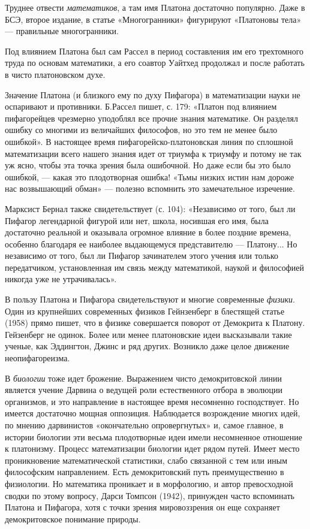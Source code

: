 Труднее отвести \textit{математиков}, а там имя Платона достаточно
популярно. Даже в БСЭ, второе издание, в статье «Многогранники»
фигурируют «Платоновы тела» --- правильные многогранники.

Под влиянием Платона был сам Рассел в период составления им его
трехтомного труда по основам математики, а его соавтор Уайтхед
продолжал и после работать в чисто платоновском духе.

Значение Платона (и близкого ему по духу Пифагора) в математизации
науки не оспаривают и противники. Б.Рассел пишет, с. 179: «Платон под
влиянием пифагорейцев чрезмерно уподоблял все прочие знания
математике. Он разделял ошибку со многими из величайших философов, но
это тем не менее было ошибкой». В настоящее время
пифагорейско-платоновская линия по сплошной математизации всего нашего
знания идет от триумфа к триумфу и потому не так уж ясно, чтобы эта
точка зрения была ошибочной. Но даже если бы это было ошибкой, ---
какая это плодотворная ошибка! «Тьмы низких истин нам дороже нас
возвышающий обман» --- полезно вспомнить это замечательное изречение.

Марксист Бернал также свидетельствует (с. 104): «Независимо от того,
был ли Пифагор легендарной фигурой или нет, школа, носившая его имя,
была достаточно реальной и оказывала огромное влияние в более поздние
времена, особенно благодаря ее наиболее выдающемуся представителю ---
Платону... Но независимо от того, был ли Пифагор зачинателем этого
учения или только передатчиком, установленная им связь между
математикой, наукой и философией никогда уже не утрачивалась».

В пользу Платона и Пифагора свидетельствуют и многие современные
\textit{физики}. Один из крупнейших современных физиков Гейнзенберг в
блестящей статье (1958) прямо пишет, что в физике совершается поворот
от Демокрита к Платону. Гейзенберг не одинок. Более или менее
платоновские идеи высказывали такие ученые, как Эддингтон, Джинс и ряд
других. Возникло даже целое движение неопифагореизма.

В \textit{биологии} тоже идет брожение. Выражением чисто
демокритовской линии является учение Дарвина о ведущей роли
естественного отбора в эволюции организмов, и это направление в
настоящее время несомненно господствует. Но имеется достаточно мощная
оппозиция. Наблюдается возрождение многих идей, по мнению дарвинистов
«окончательно опровергнутых» и, самое главное, в истории биологии эти
весьма плодотворные идеи имели несомненное отношение к платонизму.
Процесс математизации биологии идет рядом путей. Имеет место
проникновение математической статистики, слабо связанной с тем или
иным философским направлением. Есть демокритовский путь
преимущественно в физиологии. Но математика проникает и в морфологию,
и автор превосходной сводки по этому вопросу, Дарси Томпсон (1942),
принужден часто вспоминать Платона и Пифагора, хотя с точки зрения
мировоззрения он еще сохраняет демокритовское понимание природы.

